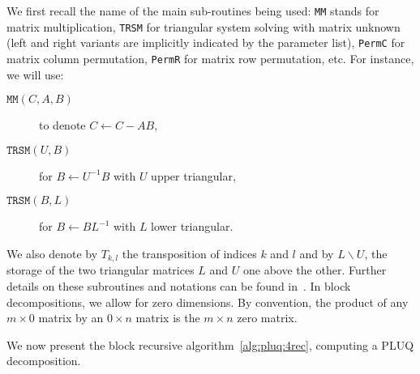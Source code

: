 \documentclass{article}
\newcommand{\strechparskip}[1]{}
\newcommand{\strechparsep}[1]{}
\newcommand{\customvspace}[1]{}
\newcommand{\trsm}{\texttt{TRSM}\xspace}
\newcommand{\MM}{\texttt{MM}\xspace}
\begin{document}
\setlength{\arraycolsep}{.8\arraycolsep}
We first  recall the name of the main sub-routines being used: \MM
stands for matrix multiplication, \trsm for triangular system solving
with matrix unknown (left and right variants are implicitly indicated
by the parameter list), \texttt{PermC} for matrix column permutation,
\texttt{PermR} for matrix row permutation, etc. For instance, we will use:
\customvspace{-12pt}
\begin{description}
\strechparskip{0pt}
\strechparsep{-1pt}
\item[$\MM(C,A,B)$] to denote $C\leftarrow C-AB$,
\item[$\trsm(U,B)$] for $B\leftarrow
  U^{-1}B$ with $U$ upper triangular,
\item[$\trsm(B,L)$] for $B\leftarrow BL^{-1}$ with $L$ lower triangular.
\end{description}
\customvspace{-12pt}
We  also denote by $T_{k,l}$ the transposition of indices $k$ and $l$ and by 
$L\backslash U$, the storage of the two triangular matrices $L$ and $U$ one
above the other. 
Further details on these subroutines and notations can be found in~\cite{JPS:2011}.
In block decompositions, we  allow for zero dimensions. By convention,
the product of any $m\times 0$ matrix by an $0\times n$ matrix is  the
$m\times n$ zero matrix.

We now present the block recursive algorithm~\ref{alg:pluq:4rec},
computing a PLUQ decomposition. 
\end{document}
